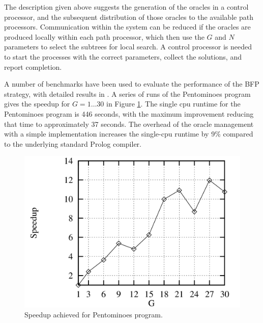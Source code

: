 \documentclass[a4paper,11pt,twoside]{article}
\begin{document}
The description given above suggests the generation of the oracles
in a control processor, and the 
subsequent distribution of those oracles to
the available path processors.
Communication within the system can be reduced if the oracles are
produced locally within each path processor, which then use the
$G$ and $N$ parameters to select the subtrees for local search.  A
control processor is needed to start the processes with the correct
parameters, collect the solutions, and report completion.

A number of benchmarks have been used to evaluate the performance of
the BFP strategy, with detailed results in \cite{Sar95, Lew98}.  
A series of runs of the Pentominoes program
\cite{Lew98} gives the speedup for $G=1\ldots 30$ 
in Figure \ref{pent_bfp}.  The single cpu runtime for the
Pentominoes program is 446 seconds, with the maximum improvement
reducing that time to approximately 37 seconds.  The overhead of the
oracle management
with a simple implementation increases the single-cpu runtime
by 9\% compared to the underlying standard Prolog
compiler.

\begin{figure}
  \includegraphics[width=\linewidth]{pent_bfp.png}
  \caption{Speedup achieved for Pentominoes program.}
  \label{pent_bfp}
\end{figure}
\end{document}
